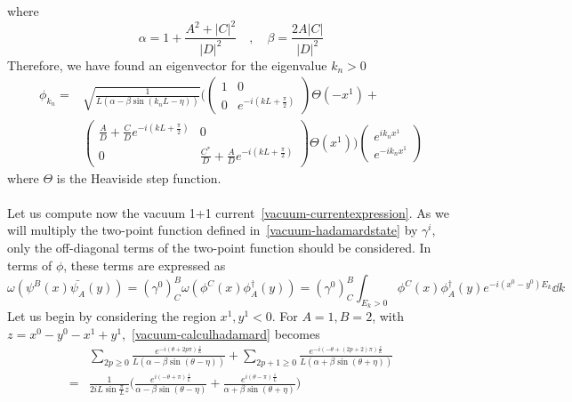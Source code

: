 where 
\begin{equation*}
\alpha = 1+\frac{A^2 + |C|^2}{|D|^2} \quad,\quad
\beta = \frac{2 A |C|}{|D|^2}
\end{equation*}
Therefore, we have found an eigenvector for the eigenvalue $k_n > 0$ 
\begin{equation}
\begin{split}
\phi_{k_{n}} = 
& \sqrt{\frac{1}{L(\alpha - \beta \sin (k_{n}L - \eta))}} \Bigg( 
\begin{pmatrix}
1 & 0 \\
0  & e^{-i(kL + \frac{\pi}{2})}
\end{pmatrix}
\Theta(-x^1) + \\
& \begin{pmatrix}
\frac{A}{D}  +  \frac{C}{D} e^{-i(kL + \frac{\pi}{2})} & 0 \\
0  & \frac{C^*}{D}  + \frac{A}{D}e^{-i(kL + \frac{\pi}{2})}
\end{pmatrix}\Theta(x^1)\Bigg)
\begin{pmatrix}
e^{ik_{n} x^1} \\
e^{- ik_{n} x^1}
\end{pmatrix}
\end{split}
\end{equation}
where $\Theta$ is the Heaviside step function.\\\\
Let us compute now the vacuum 1+1 current~\cref{vacuum-currentexpression}.
As we will multiply the two-point function defined in~\cref{vacuum-hadamardstate} by $\gamma^i$, 
only the off-diagonal terms of the two-point function should be considered.
In terms of $\phi$, these terms are expressed as
\begin{equation}\label{vacuum-calculhadamard}
\omega(\psi^B(x) \bar{\psi_A}(y)) = 
(\gamma^0)^B_C \omega(\phi^C(x) \phi^\dagger_A(y)) = (\gamma^0)^B_C
\int_{E_k > 0} \phi^C(x) \phi^\dagger_A(y) e^{-i(x^0 - y^0) E_k} \dd k
\end{equation}
Let us begin by considering the region $x^1, y^1 < 0$. 
For $A =1, B= 2$, with $z =x^0 - y^0 - x^1 +y^1$,~\cref{vacuum-calculhadamard} becomes
\begin{equation*}
\begin{split}
& \sum_{2p \geq 0} \frac{e^{-i(\theta + 2p\pi)\frac{z}{L}}}{L(\alpha - \beta \sin (\theta - \eta))} 
+ \sum_{2p+1 \geq 0} \frac{e^{-i(- \theta + (2p+2)\pi)\frac{z}{L}}}{L(\alpha + \beta \sin (\theta + \eta))}\\
%
=& 
\frac{1}{2i L\sin\frac{\pi}{L}z} \bigg( \frac{e^{i(-\theta + \pi)\frac{z}{L}}}{\alpha - \beta \sin (\theta - \eta)}
+ \frac{e^{i(\theta - \pi) \frac{z}{L}}}{\alpha + \beta \sin (\theta + \eta)}
\bigg)
\end{split}
\end{equation*}
